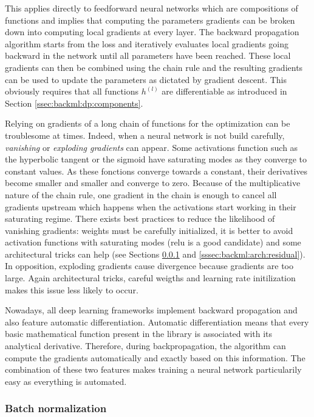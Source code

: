 This applies directly to feedforward neural networks which are compositions of functions and implies that computing the parameters gradients can be broken down into computing local gradients at every layer. The backward propagation algorithm starts from the loss and iteratively evaluates local gradients going backward in the network until all parameters have been reached. These local gradients can then be combined using the chain rule and the resulting gradients can be used to update the parameters as dictated by gradient descent. This obviously requires that all functions $h^{(l)}$ are differentiable as introduced in Section \ref{ssec:backml:dp:components}. 

Relying on gradients of a long chain of functions for the optimization can be troublesome at times. Indeed, when a neural network is not build carefully, \textit{vanishing} or \textit{exploding gradients} can appear. Some activations function such as the hyperbolic tangent or the sigmoid have saturating modes as they converge to constant values. As these fonctions converge towards a constant, their derivatives become smaller and smaller and converge to zero. Because of the multiplicative nature of the chain rule, one gradient in the chain is enough to cancel all gradients upstream which happens when the activations start working in their saturating regime. There exists best practices to reduce the likelihood of vanishing gradients: weights must be carefully initialized, it is better to avoid activation functions with saturating modes (\acrshort{relu} is a good candidate) and some architectural tricks can help (see Sections \ref{sssec:backml:batchnorm} and \ref{sssec:backml:arch:residual}). In opposition, exploding gradients cause divergence because gradients are too large. Again architectural tricks, careful weigths and learning rate initilization makes this issue less likely to occur.

Nowadays, all deep learning frameworks implement backward propagation and also feature automatic differentiation. Automatic differentiation means that every basic mathematical function present in the library is associated with its analytical derivative. Therefore, during backpropagation, the algorithm can compute the gradients automatically and exactly based on this information. The combination of these two features makes training a neural network particularily easy as everything is automated. 

\subsubsection{Batch normalization}
\label{sssec:backml:batchnorm}

